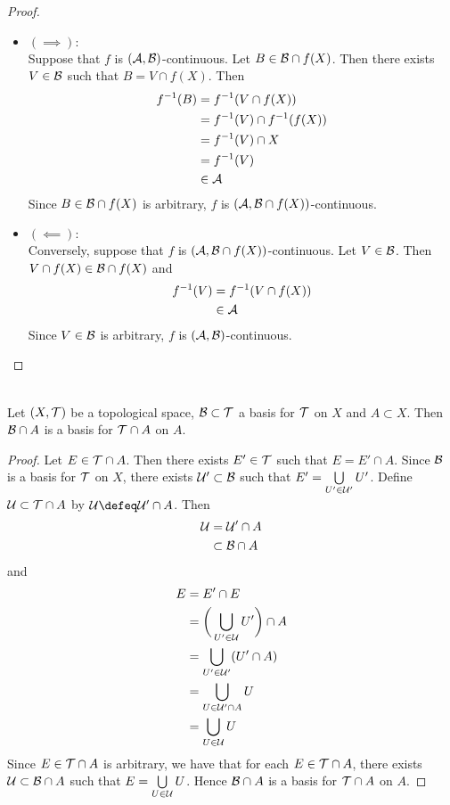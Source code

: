 \documentclass{book}
\begin{document}
\begin{proof}\
	\begin{itemize}
		\item $(\implies):$ \\
		Suppose that $f$ is $(\mathcal{A}, \mathcal{B})$-continuous. Let $B \in \mathcal{B} \cap f(X)$. Then there exists $V \in \mathcal{B}$ such that $B = V \cap f(X)$. Then 
		\begin{align*}
			f^{-1}(B)
			& = f^{-1}(V \cap f(X)) \\
			& = f^{-1}(V) \cap f^{-1}(f(X)) \\
			& = f^{-1}(V) \cap X \\
			& = f^{-1}(V) \\
			& \in \mathcal{A}
		\end{align*}
		Since $B \in \mathcal{B} \cap f(X)$ is arbitrary, $f$ is  $(\mathcal{A}, \mathcal{B} \cap f(X))$-continuous. 
		\item $(\impliedby):$ \\
		Conversely, suppose that $f$ is  $(\mathcal{A}, \mathcal{B} \cap f(X))$-continuous. Let $V \in \mathcal{B}$. Then $V \cap f(X) \in \mathcal{B} \cap f(X)$ and 
		\begin{align*}
			f^{-1}(V)
			& = f^{-1}(V \cap f(X)) \\
			& \in \mathcal{A}  
		\end{align*} 
		Since $V \in \mathcal{B}$ is arbitrary, $f$ is  $(\mathcal{A}, \mathcal{B})$-continuous. 
	\end{itemize}
\end{proof}

\begin{ex}   \\
	Let $(X, \mathcal{T})$ be a topological space, $\mathcal{B} \subset \mathcal{T}$ a basis for $\mathcal{T}$ on $X$ and $A \subset X$. Then $\mathcal{B} \cap A$ is a basis for $\mathcal{T} \cap A$ on $A$. 
\end{ex}

\begin{proof}
	Let $E \in \mathcal{T} \cap A$. Then there exists $E' \in \mathcal{T}$ such that $E = E' \cap A$. Since $\mathcal{B}$ is a basis for $\mathcal{T}$ on $X$, there exists $\mathcal{U}' \subset \mathcal{B}$ such that $E' = \bigcup\limits_{U' \in \mathcal{U}'} U'$. Define $\mathcal{U} \subset \mathcal{T} \cap A$ by $\MU \defeq \MU' \cap A$. Then 
	\begin{align*}
		\mathcal{U}
		& = \mathcal{U}' \cap A \\
		& \subset \mathcal{B} \cap A
	\end{align*}
	and
	\begin{align*}
		E
		& = E' \cap E \\
		& = \bigg( \bigcup\limits_{U' \in \mathcal{U}} U' \bigg)  \cap A \\
		& = \bigcup\limits_{U' \in \mathcal{U}'} (U' \cap A) \\
		& = \bigcup\limits_{U \in \mathcal{U}' \cap A} U \\
		& = \bigcup\limits_{U \in \mathcal{U}} U 
	\end{align*}
	Since $E \in \mathcal{T} \cap A$ is arbitrary, we have that for each $E \in \mathcal{T} \cap A$, there exists $\mathcal{U} \subset \mathcal{B} \cap A$ such that $E = \bigcup\limits_{U \in \mathcal{U}} U $. Hence $\mathcal{B} \cap A$ is a basis for $\mathcal{T} \cap A$ on $A$.
\end{proof}
\end{document}
